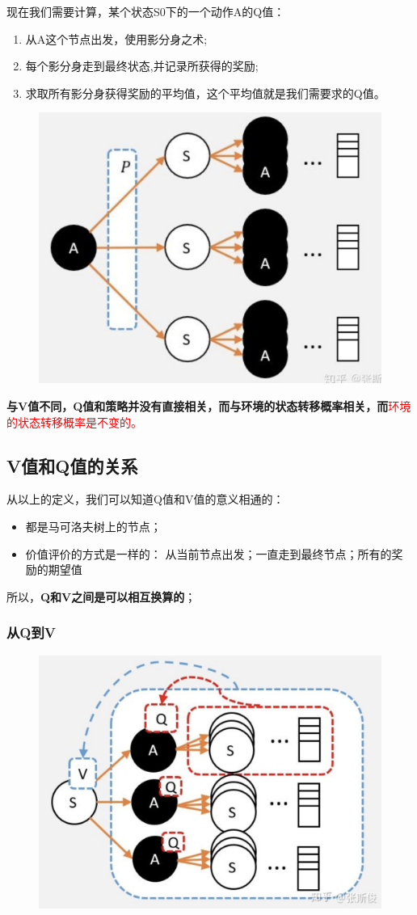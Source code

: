 \documentclass[12pt]{article}
\begin{document}
现在我们需要计算，某个状态S0下的一个动作A的Q值：\begin{enumerate}
\setlength{\itemsep}{0pt}
\setlength{\parsep}{0pt}
\setlength{\parskip}{0pt}
    \item 从A这个节点出发，使用影分身之术;
    \item 每个影分身走到最终状态,并记录所获得的奖励;
    \item 求取所有影分身获得奖励的平均值，这个平均值就是我们需要求的Q值。
\end{enumerate}

\begin{figure}[H]
    \centering
    \includegraphics[width=.3\textwidth]{fig/ReinforcementLearning/RL_Compute_Q.png}
\end{figure}

\textbf{与V值不同，Q值和策略并没有直接相关，而与环境的状态转移概率相关，而}\textcolor{red}{环境的状态转移概率是不变的。}

\subsection{V值和Q值的关系}
从以上的定义，我们可以知道Q值和V值的意义相通的：
\begin{itemize}
\setlength{\itemsep}{0pt}
\setlength{\parsep}{0pt}
\setlength{\parskip}{0pt}
    \item 都是马可洛夫树上的节点；
    \item 价值评价的方式是一样的： 从当前节点出发；一直走到最终节点；所有的奖励的期望值
\end{itemize}

所以，\textbf{Q和V之间是可以相互换算的}；

\subsubsection{从Q到V}
\begin{figure}[H]
    \centering
    \includegraphics[width=.6\textwidth]{fig/ReinforcementLearning/RL_Compute_V_From_Q.png}
\end{figure}
\end{document}
